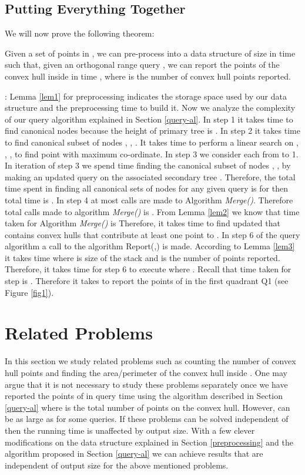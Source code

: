 \documentclass[runningheads,a4paper]{llncs}
\begin{document}
\subsection{Putting Everything Together}
We will now prove the following theorem:
\begin{theorem}
  Given a set  of  points in , we can pre-process 
  into a data structure of size  in time 
  such that, given an orthogonal range query , we can report the points of the convex hull inside  in time , where  is the number of convex hull
  points reported.
\end{theorem}
 : Lemma \ref{lem1} for preprocessing indicates the storage space
used by our data structure and the preprocessing time to build it.  Now we analyze the
complexity of our query algorithm explained in Section \ref{query-al}.  In
step 1 it takes  time to find  canonical nodes
because the height of primary tree  is .  In step 2 it takes
 time to find canonical subset of nodes ,
, . It takes  time to perform a linear
search on , , ,  to
find point  with maximum  co-ordinate.  In step 3 we consider
each  from  to 1. In  iteration of step 3 we
spend  time finding the canonical subset of nodes , ,  by making an updated query on the associated
secondary tree . Therefore, the total time spent in finding all
canonical sets of nodes for any given query is  
for  then total time is . In step 4 at
most  calls are made to Algorithm \emph{Merge()}. Therefore total calls made to algorithm \emph{Merge()} is .
From Lemma \ref{lem2} we know that time taken for Algorithm \emph{Merge()} is 
Therefore, it takes  time to find updated  that contains convex hulls that contribute
at least one point to .
In step 6 of the query algorithm a call to the algorithm Report(,) is made.
According to Lemma \ref{lem3} it takes  time where  is size of the stack  and  is the number of points
reported. Therefore, it takes  time for step 6 to execute where . Recall that time taken for step  is .
Therefore it takes  to report the points of  in the first quadrant Q1 (see Figure \ref{fig1}).

\section{Related Problems}\label{other}
In this section we study related problems such as counting the number of
convex hull points and finding the area/perimeter of the convex hull inside .  One may argue that it is not necessary to study these problems
separately once we have reported the points of  in query time
 using the algorithm described in Section \ref{query-al}
where  is the total number of points on the convex hull. However,  can
be as large as  for some queries.
If these problems can be solved independent of  then the running time is
unaffected by output size.  With a few clever modifications on the data
structure explained in Section \ref{preprocessing} and the algorithm proposed
in Section \ref{query-al} we can achieve results that are independent of
output size for the above mentioned problems.
\end{document}
